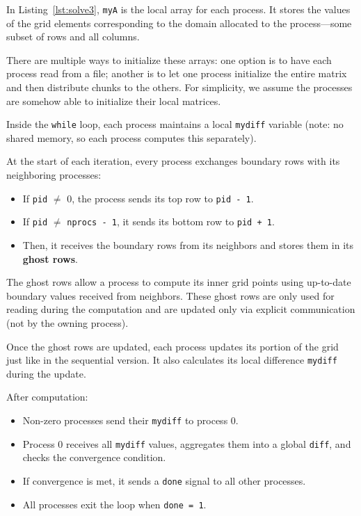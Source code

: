 \documentclass[12pt]{book}
\begin{document}
In Listing~\ref{lst:solve3}, \texttt{myA} is the local array for each process. It stores the values of the grid elements corresponding to the domain allocated to the process—some subset of rows and all columns.

There are multiple ways to initialize these arrays: one option is to have each process read from a file; another is to let one process initialize the entire matrix and then distribute chunks to the others. For simplicity, we assume the processes are somehow able to initialize their local matrices.

Inside the \texttt{while} loop, each process maintains a local \texttt{mydiff} variable (note: no shared memory, so each process computes this separately).

At the start of each iteration, every process exchanges boundary rows with its neighboring processes:
\begin{itemize}
    \item If \texttt{pid} $\neq$ 0, the process sends its top row to \texttt{pid - 1}.
    \item If \texttt{pid} $\neq$ \texttt{nprocs - 1}, it sends its bottom row to \texttt{pid + 1}.
    \item Then, it receives the boundary rows from its neighbors and stores them in its \textbf{ghost rows}.
\end{itemize}

The ghost rows allow a process to compute its inner grid points using up-to-date boundary values received from neighbors. These ghost rows are only used for reading during the computation and are updated only via explicit communication (not by the owning process).

Once the ghost rows are updated, each process updates its portion of the grid just like in the sequential version. It also calculates its local difference \texttt{mydiff} during the update.

After computation:
\begin{itemize}
    \item Non-zero processes send their \texttt{mydiff} to process 0.
    \item Process 0 receives all \texttt{mydiff} values, aggregates them into a global \texttt{diff}, and checks the convergence condition.
    \item If convergence is met, it sends a \texttt{done} signal to all other processes.
    \item All processes exit the loop when \texttt{done = 1}.
\end{itemize}
\end{document}
